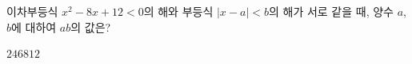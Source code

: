 이차부등식 $x^2-8x+12<0$의 해와 부등식 $|x-a|<b$의 해가 서로 같을 때, 양수 $a$, $b$에 대하여 $ab$의 값은?
\begin{choices32}{$2$}{$4$}{$6$}{$8$}{$12$}\end{choices32}
